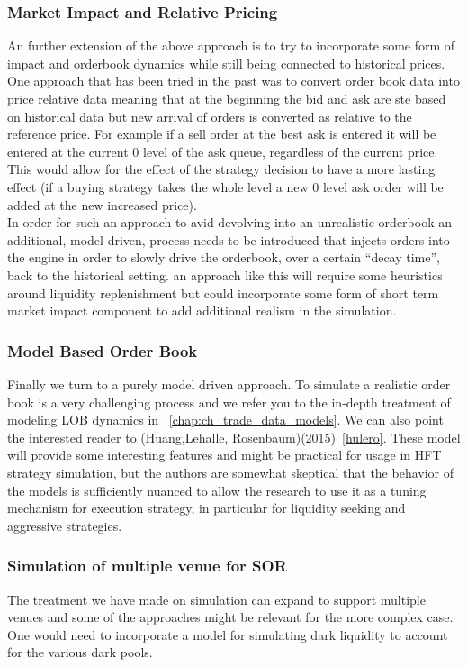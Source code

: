\subsubsection{Market Impact and Relative Pricing}
An further extension of the above approach is to try to incorporate some form of impact and orderbook dynamics while still being connected to historical prices. One approach that has been tried in the past was to convert order book data into price relative data meaning that at the beginning the bid and ask are ste based on historical data but new arrival of orders is converted as relative to the reference price. For example if a sell order at the best ask is entered it will be entered at the current 0 level of the ask queue, regardless of the current price. This would allow for the effect of the strategy decision to have a more lasting effect (if a buying strategy takes the whole level a new 0 level ask order will be added at the new increased price). \\

In order for such an approach to avid devolving into an unrealistic orderbook an additional, model driven, process needs to be introduced that injects orders into the engine in order to slowly drive the orderbook, over a certain ``decay time'', back to the historical setting. an approach like this will require some heuristics around liquidity replenishment but could incorporate some form of short term market impact component to add additional realism in the simulation.

\subsubsection{Model Based Order Book}
Finally we turn to a purely model driven approach. To simulate a realistic order book is a very challenging process and we refer you to the in-depth treatment of modeling LOB dynamics in ~\ref{chap:ch_trade_data_models}. We can also point the interested reader to (Huang,Lehalle, Rosenbaum)(2015)~\ref{hulero}. These model will provide some interesting features and might be practical for usage in HFT strategy simulation, but the authors are somewhat skeptical that the behavior of the models is sufficiently nuanced to allow the research to use it as a tuning mechanism for execution strategy, in particular for liquidity seeking and aggressive strategies.

\subsubsection{Simulation of multiple venue for SOR}
The treatment we have made on simulation can expand to support multiple venues and some of the approaches might be relevant for the more complex case. One would need to incorporate a model for simulating dark liquidity to account for the various dark pools. 

